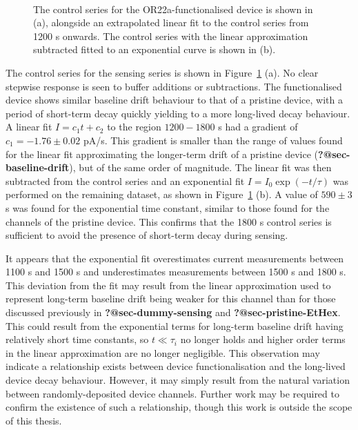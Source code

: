 \documentclass[
  a4paper,
]{scrbook}
\begin{document}
\begin{figure}
\begin{minipage}[t]{0.70\linewidth}
{{}

}

\end{minipage}%
%
\begin{minipage}[t]{0.15\linewidth}

{\centering 

~

}

\end{minipage}%

\caption{\label{fig-OR22a-control-series}The control series for the
OR22a-functionalised device is shown in (a), alongside an extrapolated
linear fit to the control series from 1200 s onwards. The control series
with the linear approximation subtracted fitted to an exponential curve
is shown in (b).}

\end{figure}

The control series for the sensing series is shown in
Figure~\ref{fig-OR22a-control-series} (a). No clear stepwise response is
seen to buffer additions or subtractions. The functionalised device
shows similar baseline drift behaviour to that of a pristine device,
with a period of short-term decay quickly yielding to a more long-lived
decay behaviour. A linear fit \(I = c_1t + c_2\) to the region
\(1200-1800\) s had a gradient of \(c_1 = -1.76\pm0.02\) pA/s. This
gradient is smaller than the range of values found for the linear fit
approximating the longer-term drift of a pristine device
(\textbf{?@sec-baseline-drift}), but of the same order of magnitude. The
linear fit was then subtracted from the control series and an
exponential fit \(I = I_0\exp(-t/\tau)\) was performed on the remaining
dataset, as shown in Figure~\ref{fig-OR22a-control-series} (b). A value
of \(590 \pm 3\) s was found for the exponential time constant, similar
to those found for the channels of the pristine device. This confirms
that the 1800 s control series is sufficient to avoid the presence of
short-term decay during sensing.

It appears that the exponential fit overestimates current measurements
between 1100 s and 1500 s and underestimates measurements between 1500 s
and 1800 s. This deviation from the fit may result from the linear
approximation used to represent long-term baseline drift being weaker
for this channel than for those discussed previously in
\textbf{?@sec-dummy-sensing} and \textbf{?@sec-pristine-EtHex}. This
could result from the exponential terms for long-term baseline drift
having relatively short time constants, so \(t\ll\tau_i\) no longer
holds and higher order terms in the linear approximation are no longer
negligible. This observation may indicate a relationship exists between
device functionalisation and the long-lived device decay behaviour.
However, it may simply result from the natural variation between
randomly-deposited device channels. Further work may be required to
confirm the existence of such a relationship, though this work is
outside the scope of this thesis.
\end{document}
